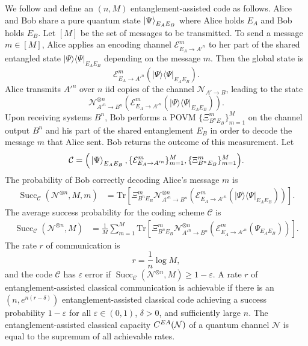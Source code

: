 \documentclass[a4paper,onecolumn,11pt,accepted=2025-10-01]{quantumarticle}
\DeclareMathOperator{\suc}{Succ}
\newcommand*{\cC}{\mathcal{C}}
\newcommand*{\cE}{\mathcal{E}}
\newcommand*{\cN}{\mathcal{N}}
\newcommand*{\eps}{\varepsilon}
\newcommand*{\tr}[1]{\mathrm{Tr}\left[#1\right]}
\newcommand*{\proj}[1]{|#1\rangle\!\langle #1|}
\begin{document}
We follow \cite{wilde2013book} and define an $(n,M)$ entanglement-assisted code as follows. Alice and Bob share a pure quantum state $\ket{\Psi}_{E_AE_B}$ where Alice holds $E_A$ and Bob holds $E_B$. Let $[M]$ be the set of messages to be transmitted. To send a message $m\in [M]$, Alice applies an encoding channel $\cE^m_{E_A\rightarrow A'^n}$ to her part of the shared entangled state $\proj{\Psi}_{E_AE_B}$ depending on the message $m$. Then the  global state is 
\begin{equation}
    \cE^m_{E_A\rightarrow A'^n}\left(\proj{\Psi}_{E_AE_B}\right). 
\end{equation}
Alice transmits $A'^n$ over $n$ iid copies of the channel $\cN^{}_{A'\rightarrow B}$, leading to the state 
\begin{equation}
    \cN^{\otimes n}_{A'^n\rightarrow B^n}\left( \cE^m_{E_A\rightarrow A'^n}\left(\proj{\Psi}_{E_AE_B}\right)\right). 
\end{equation}
Upon receiving systems $B^n$, Bob performs a POVM $\{\Xi^m_{B^nE_B}\}_{m=1}^M$ on the channel output $B^n$ and his part of the shared entanglement $E_B$ in order to decode the message $m$ that Alice sent. Bob returns the outcome of this measurement. Let
\begin{align}
\cC = \Big(\ket{\Psi}_{E_AE_B},  \{\cE^m_{E_A \rightarrow A'^n}\}_{m=1}^M, \{\Xi^m_{B^nE_B}\}_{m=1}^M\Big).
\end{align}
The probability of Bob correctly decoding Alice's message $m$ is 
\begin{align}
    \suc_{\cC}(\cN^{\otimes n}, M, m) 
    &= \tr{\Xi^m_{B^nE_B} \cN^{\otimes n}_{A'^n\rightarrow B^n}\left( \cE^m_{E_A\rightarrow A'^n}\left(\proj{\Psi}_{E_AE_B}\right)\right)}. 
\end{align}
The average success probability for the coding scheme $\cC$ is 
\begin{align}
    \suc_{\cC}(\cN^{\otimes n}, M)  &= \!\frac{1}{M}\!\sum_{m=1}^M \! \mathrm{Tr}\!\left[\Xi^m_{B^nE_B} \cN^{\otimes n}_{A'^n\rightarrow B^n}\!\left(\! \cE^m_{E_A\rightarrow A'^n}\!\left({\Psi}_{E_AE_B}\right)\!\right)\!\right]\!. 
\end{align}
The rate $r$ of communication is 
\begin{equation}
    r= \frac{1}{n}\log M,
\end{equation}
and the code $\cC$ has $\eps$ error if $\suc_{\cC}(\cN^{\otimes n}, M)\ge 1-\eps$. A rate $r$ of entanglement-assisted classical communication is achievable if there is an $(n, e^{n(r-\delta)})$ entanglement-assisted classical code achieving a success probability $1-\eps$ for all $\eps\in(0,1)$, $\delta>0$, and sufficiently large $n$. 
 The entanglement-assisted classical capacity $C^{\rm{EA}}(\cN)$ of a quantum channel $\cN$ is equal to the supremum of all achievable rates. 
\end{document}
